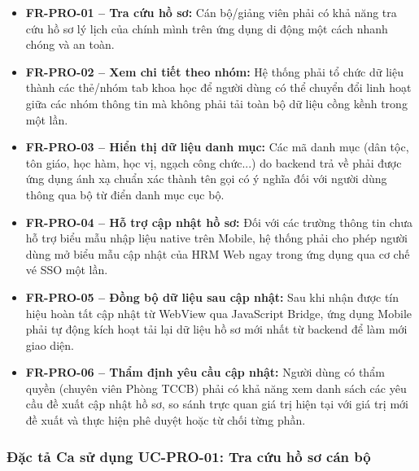 \begin{itemize}[leftmargin=1.5cm]
    \item \textbf{FR-PRO-01 -- Tra cứu hồ sơ:} Cán bộ/giảng viên phải có khả năng tra cứu hồ sơ lý lịch của chính mình trên ứng dụng di động một cách nhanh chóng và an toàn.
    
    \item \textbf{FR-PRO-02 -- Xem chi tiết theo nhóm:} Hệ thống phải tổ chức dữ liệu thành các thẻ/nhóm tab khoa học để người dùng có thể chuyển đổi linh hoạt giữa các nhóm thông tin mà không phải tải toàn bộ dữ liệu cồng kềnh trong một lần.
    
    \item \textbf{FR-PRO-03 -- Hiển thị dữ liệu danh mục:} Các mã danh mục (dân tộc, tôn giáo, học hàm, học vị, ngạch công chức...) do backend trả về phải được ứng dụng ánh xạ chuẩn xác thành tên gọi có ý nghĩa đối với người dùng thông qua bộ từ điển danh mục cục bộ.
    
    \item \textbf{FR-PRO-04 -- Hỗ trợ cập nhật hồ sơ:} Đối với các trường thông tin chưa hỗ trợ biểu mẫu nhập liệu native trên Mobile, hệ thống phải cho phép người dùng mở biểu mẫu cập nhật của HRM Web ngay trong ứng dụng qua cơ chế vé SSO một lần.
    
    \item \textbf{FR-PRO-05 -- Đồng bộ dữ liệu sau cập nhật:} Sau khi nhận được tín hiệu hoàn tất cập nhật từ WebView qua JavaScript Bridge, ứng dụng Mobile phải tự động kích hoạt tải lại dữ liệu hồ sơ mới nhất từ backend để làm mới giao diện.
    
    \item \textbf{FR-PRO-06 -- Thẩm định yêu cầu cập nhật:} Người dùng có thẩm quyền (chuyên viên Phòng TCCB) phải có khả năng xem danh sách các yêu cầu đề xuất cập nhật hồ sơ, so sánh trực quan giá trị hiện tại với giá trị mới đề xuất và thực hiện phê duyệt hoặc từ chối từng phần.
\end{itemize}

\subsubsection{Đặc tả Ca sử dụng UC-PRO-01: Tra cứu hồ sơ cán bộ}

